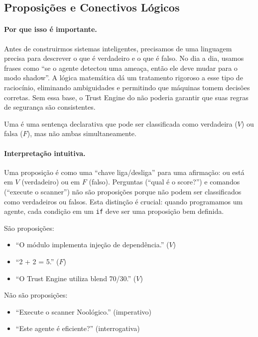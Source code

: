 \subsection{Proposições e Conectivos Lógicos}

\paragraph{Por que isso é importante.} Antes de construirmos sistemas
inteligentes, precisamos de uma linguagem precisa para descrever o que é
verdadeiro e o que é falso. No dia a dia, usamos frases como ``se o agente
detectou uma ameaça, então ele deve mudar para o modo shadow''. A lógica
matemática dá um tratamento rigoroso a esse tipo de raciocínio, eliminando
ambiguidades e permitindo que máquinas tomem decisões corretas. Sem essa
base, o Trust Engine do \opencodeeco{} não poderia garantir que suas regras
de segurança são consistentes.

\begin{definicao}[Proposição]
    Uma  é uma sentença declarativa que pode ser
    classificada como verdadeira ($V$) ou falsa ($F$), mas não ambas
    simultaneamente.
\end{definicao}

\paragraph{Interpretação intuitiva.} Uma proposição é como uma ``chave
liga/desliga'' para uma afirmação: ou está em $V$ (verdadeiro) ou em $F$
(falso). Perguntas (``qual é o score?'') e comandos (``execute o scanner'')
não são proposições porque não podem ser classificados como verdadeiros ou
falsos. Esta distinção é crucial: quando programamos um agente, cada condição
em um \lstinline{if} deve ser uma proposição bem definida.

\begin{exemplo}
    São proposições:
    \begin{itemize}
        \item ``O módulo  implementa injeção de
              dependência.'' ($V$)
        \item ``2 + 2 = 5.'' ($F$)
        \item ``O Trust Engine utiliza blend 70/30.'' ($V$)
    \end{itemize}
    Não são proposições:
    \begin{itemize}
        \item ``Execute o scanner Noológico.'' (imperativo)
        \item ``Este agente é eficiente?'' (interrogativa)
    \end{itemize}
\end{exemplo}

